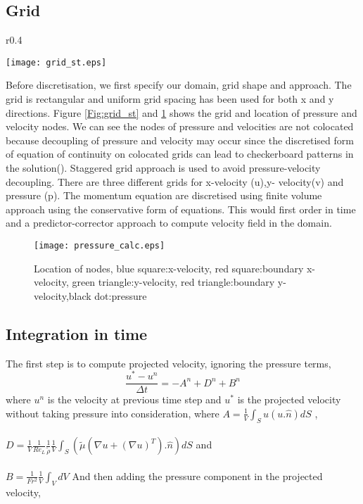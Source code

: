\subsection{Grid}
 \setlength\intextsep{0pt}
\begin{wrapfigure}{r}{0.4\textwidth}
  \begin{center}
    \texttt{[image: grid\_st.eps]}
  \end{center}
  \caption{Staggered grid for x-velocity(Blue),y-velocity(Green) and pressure(Gray)}
  \label{Fig:grid_st}
\end{wrapfigure}
Before discretisation, we first specify our domain, grid shape and approach. The grid is rectangular and uniform grid spacing has been used for both x and y directions.
Figure \ref{Fig:grid_st} and \ref{Fig:grid} shows the grid and location of pressure and velocity nodes.
We can see the nodes of pressure and velocities are not colocated because decoupling of pressure and velocity may occur since the discretised form of equation of continuity 
on colocated grids can lead to checkerboard patterns in the solution(\cite{Anderson1995}). Staggered grid approach is used to avoid pressure-velocity decoupling. 
There are three different grids for x-velocity (u),y- velocity(v) and pressure (p).  
The momentum equation are discretised using finite volume approach using the conservative form of equations. This would first order in time and a predictor-corrector approach to 
compute velocity field in the domain.
 \begin{figure}
 \centering
  \texttt{[image: pressure\_calc.eps]}
  \caption{Location of nodes, blue square:x-velocity, red square:boundary x-velocity, green triangle:y-velocity, red triangle:boundary y-velocity,black dot:pressure}
  \label{Fig:grid}
 \end{figure}


\subsection{Integration in time}
The first step is  to compute projected velocity, ignoring the pressure terms, 
\begin{equation}
 \frac{u^*-u^n}{\Delta t} =  -A^n + D^n + B^n
\end{equation}
where $u^n$ is the velocity at previous time step and $u^*$ is the projected velocity without taking pressure into consideration, 
where $A = \frac{1}{V}\int_S u(u.\hat{n})dS$ ,\\ \\ $D =\frac{1}{V}\frac{1}{Re_L}\frac{1}{\tilde\rho} \frac{1}{V}\int_S (\tilde\mu (\nabla  u + (\nabla  u)^T).\hat{n})dS $ and \\ \\
$B = \frac{1}{Fr^2}\frac{1}{V}\int_VdV  $
And then adding the pressure component in the projected velocity,

